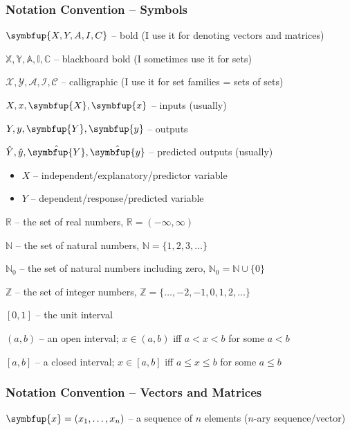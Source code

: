 \documentclass[10pt,b5paper,krantz1]{krantz}
\renewcommand{\mathbf}[1]{\symbfup{#1}}
\renewcommand{\boldsymbol}[1]{\symbfup{#1}}
\begin{document}
\hypertarget{notation-convention-symbols}{%
\subsubsection*{Notation Convention -- Symbols}\label{notation-convention-symbols}}


\(\mathbf{X,Y,A,I,C}\) -- bold (I use it for denoting vectors and matrices)

\(\mathbb{X,Y,A,I,C}\) -- blackboard bold (I sometimes use it for sets)

\(\mathcal{X,Y,A,I,C}\) -- calligraphic (I use it for set families = sets of sets)

\(X, x, \mathbf{X}, \mathbf{x}\) -- inputs (usually)

\(Y, y, \mathbf{Y}, \mathbf{y}\) -- outputs

\(\hat{Y}, \hat{y}, \hat{\mathbf{Y}}, \hat{\mathbf{y}}\) -- predicted outputs (usually)

\begin{itemize}
\item
  \(X\) -- independent/explanatory/predictor variable
\item
  \(Y\) -- dependent/response/predicted variable
\end{itemize}

\(\mathbb{R}\) -- the set of real numbers, \(\mathbb{R}=(-\infty, \infty)\)

\(\mathbb{N}\) -- the set of natural numbers, \(\mathbb{N}=\{1,2,3,\dots\}\)

\(\mathbb{N}_0\) -- the set of natural numbers including zero, \(\mathbb{N}_0=\mathbb{N}\cup\{0\}\)

\(\mathbb{Z}\) -- the set of integer numbers, \(\mathbb{Z}=\{\dots,-2,-1,0,1,2,\dots\}\)

\([0,1]\) -- the unit interval

\((a, b)\) -- an open interval; \(x\in(a,b)\) iff \(a < x < b\) for some \(a< b\)

\([a, b]\) -- a closed interval; \(x\in[a,b]\) iff \(a \le x \le b\) for some \(a\le b\)

\hypertarget{notation-convention-vectors-and-matrices}{%
\subsubsection*{Notation Convention -- Vectors and Matrices}\label{notation-convention-vectors-and-matrices}}


\(\boldsymbol{x}=(x_1,\dots,x_n)\) -- a sequence of \(n\) elements (\(n\)-ary sequence/vector)
\end{document}
